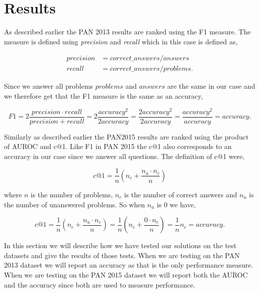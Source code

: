 \section{Results}
As described earlier the PAN 2013 results are ranked using the F1 measure. The
measure is defined using \textit{precision} and \textit{recall} which in this
case is defined as,

\begin{align}
    precision &=  correct\_answers / answers \\
    recall &= correct\_answers / problems.
\end{align}

Since we answer all problems $problems$ and $answers$ are the same in our case
and we therefore get that the F1 measure is the same as an accuracy,

\begin{equation}
    F1 = 2 \frac{precision \cdot recall}{precision + recall}
        = 2 \frac{accuracy^2}{2accuracy}
        = \frac{2accuracy^2}{2accuracy}
        = \frac{accuracy^2}{accuracy}
        = accuracy.
\end{equation}

Similarly as described earlier the PAN2015 results are ranked using the product
of \gls{AUROC} and c@1. Like F1 in PAN 2015 the c@1 also corresponds to an
accuracy in our case since we answer all questions. The definition of c@1 were,

\begin{equation}
    c@1 = \frac{1}{n} \left(n_c + \frac{n_u \cdot n_c}{n}\right)
\end{equation}

where $n$ is the number of problems, $n_c$ is the number of correct answers and
$n_u$ is the number of unanswered problems. So when $n_u$ is 0 we have,

\begin{equation}
    c@1 = \frac{1}{n} \left(n_c + \frac{n_u \cdot n_c}{n}\right)
        = \frac{1}{n} \left(n_c + \frac{0 \cdot n_c}{n}\right)
        = \frac{1}{n} n_c
        = accuracy.
\end{equation}

In this section we will describe how we have tested our solutions on the test
datasets and give the results of those tests. When we are testing on the PAN
2013 dataset we will report an accuracy as that is the only performance measure.
When we are testing on the PAN 2015 dataset we will report both the \gls{AUROC}
and the accuracy since both are used to measure performance.

